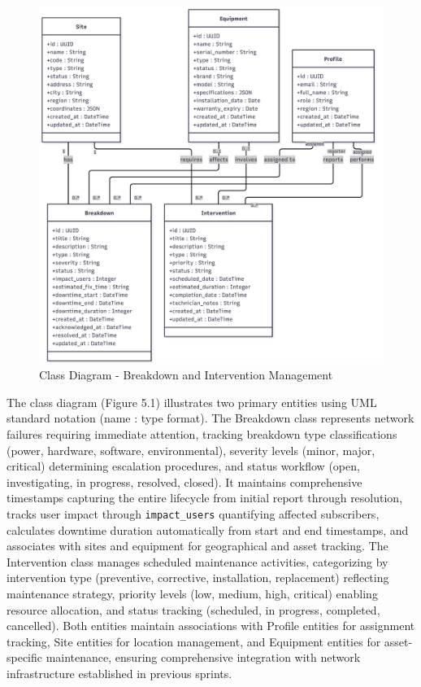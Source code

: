 \begin{figure}[H]
    \centering
    \includegraphics[width=0.95\linewidth]{img/chap_05/sprint3_class_diagram.png}
    \caption{Class Diagram - Breakdown and Intervention Management}
    \label{fig:class_diagram_sprint3}
\end{figure}


The class diagram (Figure 5.1) illustrates two primary entities using UML standard notation (name : type format). The Breakdown class represents network failures requiring immediate attention, tracking breakdown type classifications (power, hardware, software, environmental), severity levels (minor, major, critical) determining escalation procedures, and status workflow (open, investigating, in progress, resolved, closed). It maintains comprehensive timestamps capturing the entire lifecycle from initial report through resolution, tracks user impact through \texttt{impact\_users} quantifying affected subscribers, calculates downtime duration automatically from start and end timestamps, and associates with sites and equipment for geographical and asset tracking. The Intervention class manages scheduled maintenance activities, categorizing by intervention type (preventive, corrective, installation, replacement) reflecting maintenance strategy, priority levels (low, medium, high, critical) enabling resource allocation, and status tracking (scheduled, in progress, completed, cancelled). Both entities maintain associations with Profile entities for assignment tracking, Site entities for location management, and Equipment entities for asset-specific maintenance, ensuring comprehensive integration with network infrastructure established in previous sprints.

